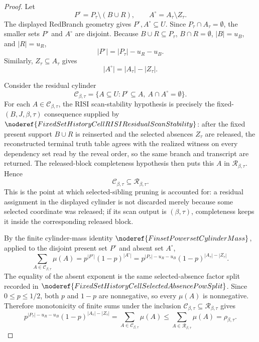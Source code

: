 \begin{proof}
Let
\[
P^\circ=P_\tau\setminus(B\cup R),\qquad
A^\circ=A_\tau\setminus Z_\tau .
\]
The displayed RedBranch geometry gives \(P^\circ,A^\circ\subseteq U\).
Since \(P_\tau\cap A_\tau=\emptyset\), the smaller sets
\(P^\circ\) and \(A^\circ\) are disjoint.  Because \(B\cup R\subseteq
P_\tau\), \(B\cap R=\emptyset\), \(|B|=u_B\), and \(|R|=u_R\),
\[
|P^\circ|=|P_\tau|-u_R-u_B .
\]
Similarly, \(Z_\tau\subseteq A_\tau\) gives
\[
|A^\circ|=|A_\tau|-|Z_\tau|.
\]

Consider the residual cylinder
\[
\mathcal C_{\beta,\tau}
  =\{A\subseteq U:P^\circ\subseteq A,\ A\cap A^\circ=\emptyset\}.
\]
For each \(A\in\mathcal C_{\beta,\tau}\), the RISI scan-stability hypothesis
is precisely the fixed-\((B,J,\beta,\tau)\) consequence supplied by
\(\noderef{FixedSetHistoryCellRISIResidualScanStability}\): after the fixed
present support \(B\cup R\) is reinserted and the selected absences
\(Z_\tau\) are released, the reconstructed terminal truth table agrees with
the realized witness on every dependency set read by the reveal order, so the
same branch and transcript are returned.  The released-block completeness
hypothesis then puts this \(A\) in \(\mathcal R_{\beta,\tau}\).  Hence
\[
\mathcal C_{\beta,\tau}\subseteq\mathcal R_{\beta,\tau}.
\]
This is the point at which selected-sibling pruning is accounted for: a
residual assignment in the displayed cylinder is not discarded merely because
some selected coordinate was released; if its scan output is
\((\beta,\tau)\), completeness keeps it inside the corresponding released
block.

By the finite cylinder-mass identity
\(\noderef{FinsetPowersetCylinderMass}\), applied to the disjoint present
set \(P^\circ\) and absent set \(A^\circ\),
\[
\sum_{A\in\mathcal C_{\beta,\tau}}\mu(A)
  =p^{|P^\circ|}(1-p)^{|A^\circ|}
  =
p^{|P_\tau|-u_R-u_B}(1-p)^{|A_\tau|-|Z_\tau|}.
\]
The equality of the absent exponent is the same selected-absence factor split
recorded in \(\noderef{FixedSetHistoryCellSelectedAbsencePowSplit}\).  Since
\(0\le p\le1/2\), both \(p\) and \(1-p\) are nonnegative, so every
\(\mu(A)\) is nonnegative.  Therefore monotonicity of finite sums under the
inclusion \(\mathcal C_{\beta,\tau}\subseteq\mathcal R_{\beta,\tau}\) gives
\[
p^{|P_\tau|-u_R-u_B}(1-p)^{|A_\tau|-|Z_\tau|}
  =\sum_{A\in\mathcal C_{\beta,\tau}}\mu(A)
  \le
  \sum_{A\in\mathcal R_{\beta,\tau}}\mu(A)
  =\rho_{\beta,\tau}.
\]
\end{proof}
